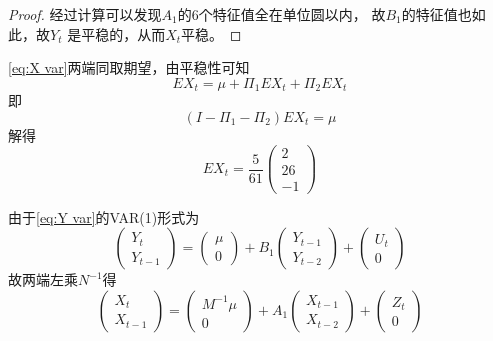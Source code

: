\documentclass[cn]{homework}
\begin{document}
\begin{subproblem}[(\alph*)]
\begin{proof}
            经过计算可以发现$A_1$的6个特征值全在单位圆以内，
            故$B_1$的特征值也如此，故$Y_t$
            是平稳的，从而$X_t$平稳。


        \end{proof}

        \item
        \cref{eq:X var}两端同取期望，由平稳性可知
        \[EX_t=\mu+\Pi_1EX_t+\Pi_2EX_t\]
        即
        \[(I-\Pi_1-\Pi_2)EX_t=\mu\]
        解得
        \[EX_t=\frac{5}{61}\begin{pmatrix}
            2\\
            26\\
            -1
        \end{pmatrix}\]

        \item
        由于\cref{eq:Y var}的VAR(1)形式为
        \[
            \begin{pmatrix}
                Y_t\\
                Y_{t-1}
            \end{pmatrix}
        =\begin{pmatrix}
            \mu \\
            0
        \end{pmatrix}
        +B_1\begin{pmatrix}
            Y_{t-1}\\
            Y_{t-2}
        \end{pmatrix}+
        \begin{pmatrix}
            U_t\\
            0
        \end{pmatrix}\]
        故两端左乘$N^{-1}$得
        \[\begin{pmatrix}
            X_t\\
            X_{t-1}
        \end{pmatrix}
        =\begin{pmatrix}
            M^{-1}\mu\\
            0
        \end{pmatrix}
        +A_1\begin{pmatrix}
            X_{t-1}\\
            X_{t-2}
        \end{pmatrix}
        +\begin{pmatrix}
            Z_t\\
            0
        \end{pmatrix}\]

\end{subproblem}
\end{document}

